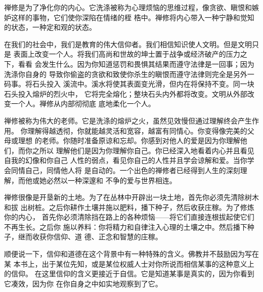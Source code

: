 禅修是为了净化你的内心。它洗涤被称为心理烦恼的思维过程，像贪欲、瞋恨和嫉妒这样的事物，它们使你深陷在情绪的桎
梏中。禅修将内心带入一种宁静和觉知的状态，一种定和观的状态。

在我们的社会中，我们是教育的伟大信仰者。我们相信知识使人文明。但是文明只是
表面上改变一个人。将我们高尚和世故的坤士置于战争或经济破产的压力之下，看看
会发生什么。因为你知道\1惩罚和畏惧其结果而遵守法律是一回事；因为洗涤你自身的
导致你偷盗的贪欲和致使你杀生的瞋恨而遵守法律则完全是另外一码事。将石头投入
溪流中。溪水将使其表面变光滑，但内在将保持不变。同一块石头投入熔炉的烈火中，
它将完全熔化；整块石头内外都将改变。文明从外部改变一个人。禅修从内部彻彻底
底地柔化一个人。

禅修被称为伟大的老师。它是洗涤的熔炉之火，虽然见效慢但通过理解终会产生作用。
你理解得越透彻，你就能越灵活和宽容，越富有同情心。你变得像完美的父母或理想
的老师。你随时准备原谅和忘却。你感到对他人的爱是因为你理解他们，而你之所以
理解他们是因为你理解你自己。你已经深入地看着内心并且看见自我的幻像和你自己
人性的弱点，看见你自己的人性并且学会谅解和爱。当你学会同情自己，同情他人将
是自动的。一个出色的禅修者已经得到人生的深刻理解，而他或她必然以一种深邃和
不争的爱与世界相连。

禅修很像是开垦新的土地。为了在丛林中开辟出一块土地，首先你必须先清除树木和拔
出树桩。之后你耕作土壤并施以肥料，播下种子，然后收获庄稼。为了修炼你的内心，
首先你必须清除挡在路上的各种烦恼——将它们直接连根拔起使它们不再生长。之后你
施以养料：你将精力和自律注入心理的土壤之中。然后播下种子，继而收获你信仰、道
德、正念和智慧的庄稼。

顺便说一下，信仰和道德在这个背景中有一种特殊的含义。\1佛教并不鼓励因为写在某
本书上，出于某位先知，或是某位权威人士对你所说而相信某事的这种意义上的信仰。
在这里信仰的含义更接近于自信。它是知道某事是真实的，因为你看到它凑效，因为你
在你自身之中如实地观察到了它。

\endchapter

\vfill\eject\byebye
